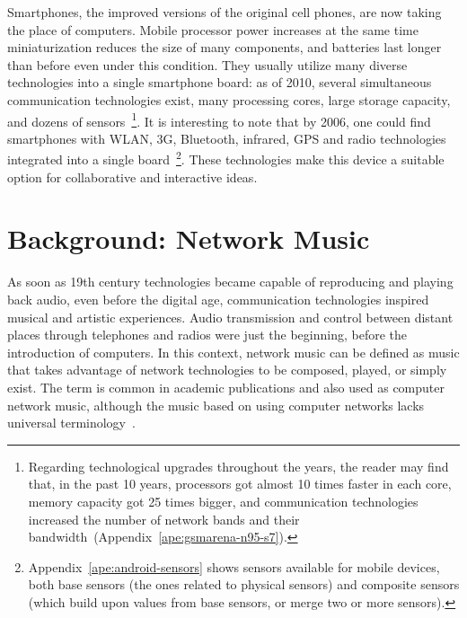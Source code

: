 Smartphones, the improved versions of the original cell phones, are now taking the place of computers.
Mobile processor power increases at the same time miniaturization reduces the size of many components, and batteries last longer than before even under this condition.
They usually utilize many diverse technologies into a single smartphone board: as of 2010, several simultaneous communication technologies exist, many processing cores, large storage capacity, and dozens of sensors~\footnote{
	Regarding technological upgrades throughout the years, the reader may find that, in the past 10 years, processors got almost 10 times faster in each core, memory capacity got 25 times bigger, and communication technologies increased the number of network bands and their bandwidth~(Appendix~\ref{ape:gsmarena-n95-s7}).}.
It is interesting to note that by 2006, one could find smartphones with WLAN, 3G, Bluetooth, infrared, GPS and radio technologies integrated into a single board~\footnote{
	Appendix~\ref{ape:android-sensors} shows sensors available for mobile devices, both base sensors (the ones related to physical sensors) and composite sensors (which build upon values from base sensors, or merge two or more sensors).}.
These technologies make this device a suitable option for collaborative and interactive ideas.

\section{Background: Network Music}
\label{sec:networkmusic}

As soon as 19th century technologies became capable of reproducing and playing back audio, even before the digital age, communication technologies inspired musical and artistic experiences.
Audio transmission and control between distant places through telephones and radios were just the beginning, before the introduction of computers.
In this context, network music can be defined as music that takes advantage of network technologies to be composed, played, or simply exist.
The term is common in academic publications and also used as computer network music, although the music based on using computer networks lacks universal terminology~\citep{Akkermann2014computer}.

